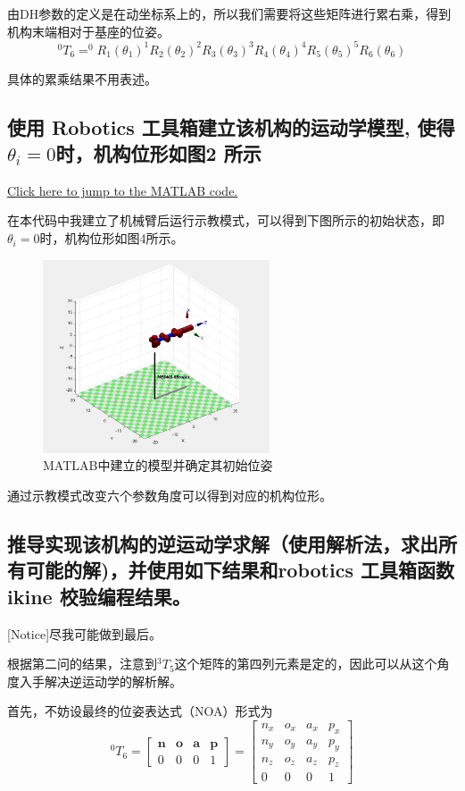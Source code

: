 \documentclass{ctexart}
\begin{document}
由DH参数的定义是在动坐标系上的，所以我们需要将这些矩阵进行累右乘，得到机构末端相对于基座的位姿。
$$
^0T_6=^0R_1(\theta_1) ^1R_2(\theta_2) ^2R_3(\theta_3) ^3R_4(\theta_4) ^4R_5(\theta_5) ^5R_6(\theta_6)
$$

具体的累乘结果不用表述。

\subsection{使用 Robotics 工具箱建立该机构的运动学模型, 使得$\theta_i=0$时，机构位形如图2
所示}

\href{src/Rhw_3_2_2_main.m}{Click here to jump to the MATLAB code.}

在本代码中我建立了机械臂后运行示教模式，可以得到下图所示的初始状态，即$\theta_i=0$时，机构位形如图4所示。
\begin{figure}[h]
	\centering
	\includegraphics[width=0.6\textwidth]{Image/4.png}
	\caption{MATLAB中建立的模型并确定其初始位姿}
\end{figure}

通过示教模式改变六个参数角度可以得到对应的机构位形。

\subsection{推导实现该机构的逆运动学求解（使用解析法，求出所有可能的解)，并使用如下结果和robotics 工具箱函数 ikine 校验编程结果。}
[Notice]尽我可能做到最后。

根据第二问的结果，注意到$^3T_5$这个矩阵的第四列元素是定的，因此可以从这个角度入手解决逆运动学的解析解。

首先，不妨设最终的位姿表达式（NOA）形式为
\begin{equation}
	^0T_6=\begin{bmatrix}
		\mathbf{n} & \mathbf{o} & \mathbf{a} & \mathbf{p} \\
		0 & 0 & 0 & 1
	\end{bmatrix}
	=
	\begin{bmatrix}
		n_x & o_x & a_x & p_x \\
		n_y & o_y & a_y & p_y \\
		n_z & o_z & a_z & p_z \\
		0 & 0 & 0 & 1
	\end{bmatrix}
\end{equation}
\end{document}
